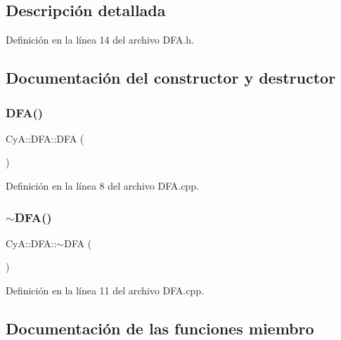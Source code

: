 \subsection{Descripción detallada}


Definición en la línea 14 del archivo D\+F\+A.\+h.



\subsection{Documentación del constructor y destructor}
\mbox{\label{class_cy_a_1_1_d_f_a_aa47549d774678cc071f40176dbe4ae83}} 
\subsubsection{\texorpdfstring{D\+F\+A()}{DFA()}}
{\footnotesize\ttfamily Cy\+A\+::\+D\+F\+A\+::\+D\+FA (\begin{DoxyParamCaption}{ }\end{DoxyParamCaption})}



Definición en la línea 8 del archivo D\+F\+A.\+cpp.

\mbox{\label{class_cy_a_1_1_d_f_a_a9f224f8a08c06679a46484128e62afb1}} 
\subsubsection{\texorpdfstring{$\sim$\+D\+F\+A()}{~DFA()}}
{\footnotesize\ttfamily Cy\+A\+::\+D\+F\+A\+::$\sim$\+D\+FA (\begin{DoxyParamCaption}{ }\end{DoxyParamCaption})}



Definición en la línea 11 del archivo D\+F\+A.\+cpp.



\subsection{Documentación de las funciones miembro}
\mbox{\label{class_cy_a_1_1_d_f_a_afb17a8e34dc6179abb59bedc97f95dc8}} 
